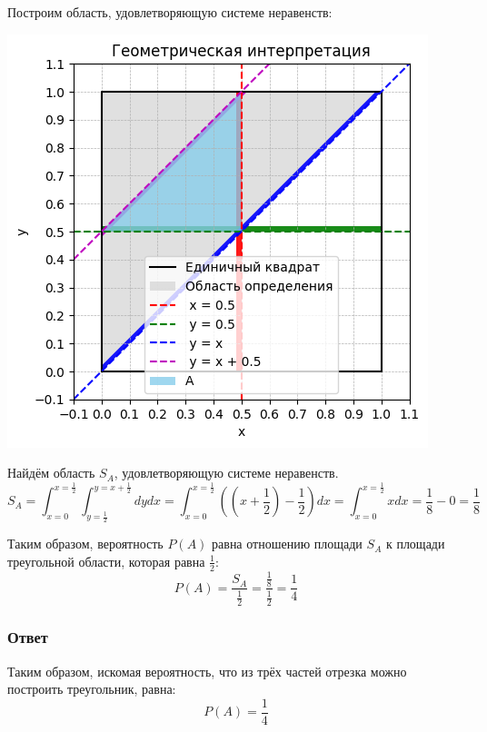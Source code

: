 \documentclass[a4paper,14pt]{extarticle}
\begin{document}
                Построим область, удовлетворяющую системе неравенств:
                \begin{center}
                    \includegraphics[scale=0.7]{2_graphics.png}
                \end{center}
                
                Найдём область \( S_A \), удовлетворяющую системе неравенств.
                \[
                    S_A =
                    \int_{x = 0}^{x = \frac{1}{2}}
                    \int_{y = \frac{1}{2}}^{y = x + \frac{1}{2}} dy dx =
                    \int_{x = 0}^{x = \frac{1}{2}}
                    ((x + \frac{1}{2}) - \frac{1}{2}) dx =
                    \int_{x = 0}^{x = \frac{1}{2}} x dx =
                    \frac{1}{8} - 0 = \frac{1}{8}
                \]
                
                Таким образом, вероятность \( P(A) \) равна отношению площади \( S_A \) к площади треугольной области, которая равна \( \frac{1}{2} \):
                \[
                    P(A) = \frac{S_A}{\frac{1}{2}} = \frac{\frac{1}{8}}{\frac{1}{2}} = \frac{1}{4}
                \]
            
            \subsubsection*{Ответ}
                Таким образом, искомая вероятность, что из трёх частей отрезка можно построить треугольник, равна:
                \[
                    \boxed{P(A) = \frac{1}{4}}
                \]
        
\end{document}
